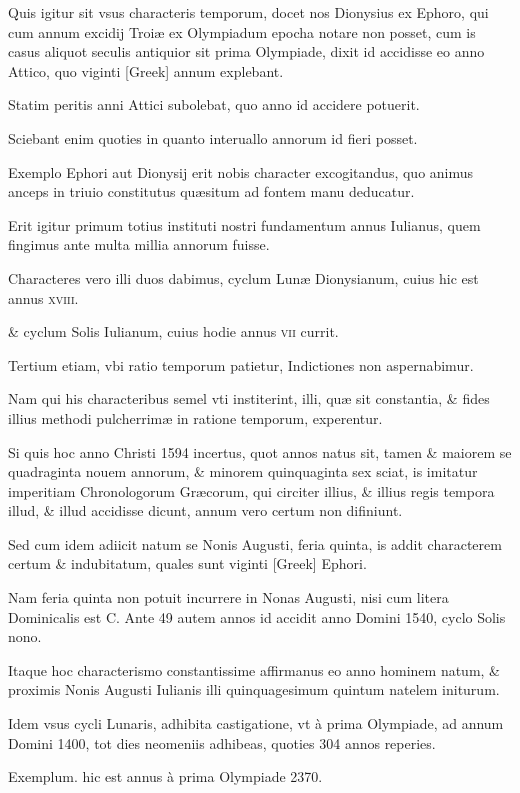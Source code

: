 Quis igitur sit vsus characteris temporum, docet nos
Dionysius ex Ephoro, qui cum annum excidij Troiæ ex Olympiadum
epocha notare non posset, cum is casus aliquot seculis antiquior
sit prima Olympiade, dixit id accidisse eo anno Attico, quo viginti
\textgreek{[Greek]} annum explebant.

Statim peritis anni Attici subolebat,
quo anno id accidere potuerit.

Sciebant enim quoties in quanto
interuallo annorum id fieri posset.

Exemplo Ephori aut Dionysij
erit nobis character excogitandus, quo animus anceps in triuio constitutus
quæsitum ad fontem manu deducatur.

Erit igitur primum
totius instituti nostri fundamentum annus Iulianus, quem fingimus
ante multa millia annorum fuisse.

Characteres vero illi duos dabimus,
cyclum Lunæ Dionysianum, cuius hic est annus \textsc{xviii}.

\& cyclum
Solis Iulianum, cuius hodie annus \textsc{vii} currit.

Tertium etiam,
vbi ratio temporum patietur, Indictiones non aspernabimur.

Nam
qui his characteribus semel vti institerint, illi, quæ sit constantia, \& fides
illius methodi pulcherrimæ in ratione temporum, experentur.

Si
quis hoc anno Christi 1594 incertus, quot annos natus sit, tamen \&
maiorem se quadraginta nouem annorum, \& minorem quinquaginta
sex sciat, is imitatur imperitiam Chronologorum Græcorum, qui
circiter illius, \& illius regis tempora illud, \& illud accidisse dicunt, annum
vero certum non difiniunt.

Sed cum idem adiicit natum se Nonis Augusti, feria quinta, is addit characterem certum \& indubitatum, quales sunt viginti \textgreek{[Greek]} Ephori.

Nam feria quinta non
potuit incurrere in Nonas Augusti, nisi cum litera Dominicalis est C.
Ante 49 autem annos id accidit anno Domini 1540, cyclo Solis nono.

Itaque hoc characterismo constantissime affirmanus eo anno hominem
natum, \& proximis Nonis Augusti Iulianis illi quinquagesimum
quintum natelem initurum.

Idem vsus cycli Lunaris, adhibita
castigatione, vt à prima Olympiade, ad annum Domini 1400, tot
dies neomeniis adhibeas, quoties 304 annos reperies.

Exemplum. hic est annus à prima Olympiade 2370.

